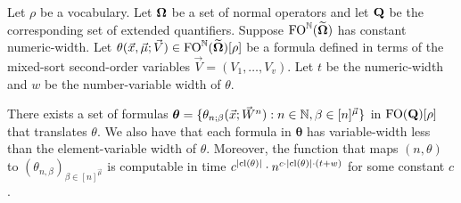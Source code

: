 \documentclass[../main/thesis.tex]{subfiles}
\begin{document}
\begin{lem}
  \label{lem:translate-program-line}
  Let $\rho$ be a vocabulary. Let $\mathbf{\mathbf{\Omega}}$ be a set of normal operators and let
  $\mathbf{Q}$ be the corresponding set of extended quantifiers. Suppose
  $\text{\upshape FO}^{\mathbb{N}} (\widetilde{\mathbf{\mathbf{\Omega}}})$ has constant numeric-width. Let
  $\theta(\vec{x}, \vec{\mu}; \vec{V}) \in \text{\upshape FO}^{\mathbb{N}} (\widetilde{\mathbf{\mathbf{\Omega}}})[\rho]$
  be a formula defined in terms of the mixed-sort second-order variables
  $\vec{V} = (V_1, \ldots, V_v)$. Let $t$ be the numeric-width and $w$ be the
  number-variable width of $\theta$.
  
  There exists a set of formulas $\boldsymbol{\theta} = \{\theta_{n;
    \beta}(\vec{x}; \vec{W}^n) : n \in \mathbb{N}, \beta \in [n]^{\vec{\mu}} \}$ in
  $\text{\upshape FO}(\mathbf{Q})[\rho]$ that translates $\theta$. We also have that each
  formula in $\boldsymbol{\theta}$ has variable-width less than the
  element-variable width of $\theta$. Moreover, the function that maps $(n,
  \theta)$ to $(\theta_{n, \beta})_{\beta \in [n]^{\vec{\mu}}}$ is computable in
  time $c^{\vert \mathrm{cl}(\theta) \vert} \cdot n^{c \cdot \vert \mathrm{cl}(\theta) \vert
    \cdot (t + w)}$ for some constant $c$.
\end{lem}
\end{document}
